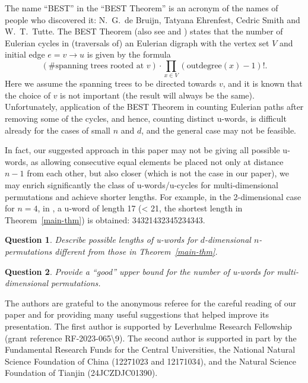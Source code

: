 \documentclass[12pt]{article}
\newtheorem{que}{Question}
\begin{document}
The name ``BEST'' in the ``BEST Theorem'' is an acronym of the names of people who discovered it: N.\ G.\ de Bruijn, Tatyana Ehrenfest, Cedric Smith and W.\ T.\ Tutte.
The BEST Theorem \cite[Theorem 5b]{vA-deB1951}  (also see \cite[pp.\ 56, 68]{Stan1999} and \cite{Fred1982}) states that the number of Eulerian cycles in (traversals of) an Eulerian digraph with the vertex set $V$ and initial edge $e=v\rightarrow u$ is given by the formula
\begin{equation}\label{BEST-formula}
(\mbox{\# spanning trees rooted at }v)\cdot\prod_{x\in V}(\mbox{outdegree}(x)-1)!.
\end{equation}
Here we assume the spanning trees to be directed towards $v$, and it is known that the choice of $v$ is not important (the result will always be the same). Unfortunately,  application of the BEST Theorem in counting Eulerian paths after removing some of the cycles, and hence, counting distinct u-words, is difficult already for the cases of small $n$ and $d$, and the general case may not be feasible. 

In fact, our suggested approach in this paper may not be giving all possible u-words, as   allowing consecutive equal elements be placed not only at distance $n-1$ from each other, but also closer (which is not the case in our paper), we may enrich significantly the class of u-words/u-cycles for multi-dimensional permutations and achieve shorter lengths. For example, in the 2-dimensional case for $n=4$, in \cite{KPV}, a u-word of length 17 (< 21, the shortest length in Theorem~\ref{main-thm}) is obtained: 34321432345234343. 

\begin{que} Describe possible lengths of u-words for $d$-dimensional $n$-permutations different from those in Theorem~\ref{main-thm}. \end{que}

\begin{que} Provide a ``good'' upper bound for the number of u-words for multi-dimensional permutations. \end{que}

\vskip 3mm
 The authors are grateful to the anonymous referee for the careful reading of our paper and for providing many useful suggestions that helped improve its presentation. The first  author is supported by Leverhulme Research Fellowship (grant reference RF-2023-065\textbackslash 9).  The second author is supported in part by the Fundamental Research Funds for the Central Universities, the National Natural Science Foundation of China (12271023 and 12171034), and the Natural Science Foundation of Tianjin (24JCZDJC01390).
\end{document}
